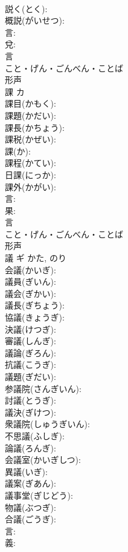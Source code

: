 \documentclass[8pt]{extreport}
\begin{document}
\begin{CJK}{UTF8}{min}
\\	説く(とく): 
\\	概説(がいせつ): 
\\	言: 
\\	兌: 
\\	言	
\\	こと・げん・ごんべん・ことば	
\\	形声 
\\	課	カ			
\\	課目(かもく): 
\\	課題(かだい): 
\\	課長(かちょう): 
\\	課税(かぜい): 
\\	課(か): 
\\	課程(かてい): 
\\	日課(にっか): 
\\	課外(かがい): 
\\	言: 
\\	果: 
\\	言	
\\	こと・げん・ごんべん・ことば	
\\	形声 
\\	議	ギ		かた, のり	
\\	会議(かいぎ): 
\\	議員(ぎいん): 
\\	議会(ぎかい): 
\\	議長(ぎちょう): 
\\	協議(きょうぎ): 
\\	決議(けつぎ): 
\\	審議(しんぎ): 
\\	議論(ぎろん): 
\\	抗議(こうぎ): 
\\	議題(ぎだい): 
\\	参議院(さんぎいん): 
\\	討議(とうぎ): 
\\	議決(ぎけつ): 
\\	衆議院(しゅうぎいん): 
\\	不思議(ふしぎ): 
\\	論議(ろんぎ): 
\\	会議室(かいぎしつ): 
\\	異議(いぎ): 
\\	議案(ぎあん): 
\\	議事堂(ぎじどう): 
\\	物議(ぶつぎ): 
\\	合議(ごうぎ): 
\\	言: 
\\	義: 

\end{CJK}
\end{document}
